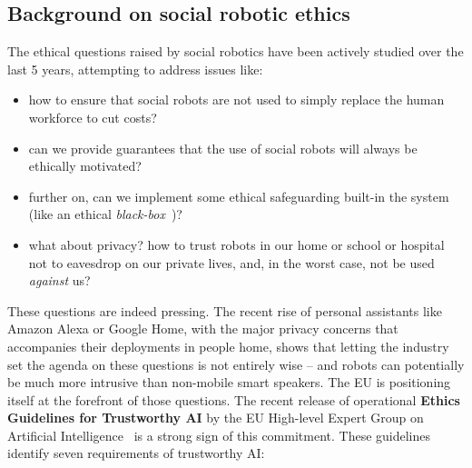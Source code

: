 \documentclass[11pt,a4paper]{report}
\begin{document}
\subsection{Background on social robotic ethics}

The ethical questions raised by social robotics have been actively studied over
the last 5 years, attempting to address issues like:

\begin{itemize}
    \item how to ensure that social robots are not used to simply replace the human
        workforce to cut costs?
    \item can we provide guarantees that the use of social robots will always be
        ethically motivated?
    \item further on, can we implement some ethical safeguarding built-in
        the system (like an ethical \emph{black-box}~\cite{winfield2017case})?
    \item what about privacy? how to trust robots in our home or school or
        hospital not to eavesdrop on our private lives, and, in the worst
        case, not be used \emph{against} us?
\end{itemize}

These questions are indeed pressing. The recent rise of personal assistants like
Amazon Alexa or Google Home, with the major privacy concerns that accompanies
their deployments in people home, shows that letting the industry set the agenda
on these questions is not entirely wise -- and robots can potentially be much
more intrusive than non-mobile smart speakers.  The EU is positioning itself at
the forefront of those questions. The recent release of operational \textbf{Ethics
Guidelines for Trustworthy AI} by the EU High-level Expert Group on Artificial
Intelligence~\cite{eu2019ethics} is a strong sign of this commitment. These
guidelines identify seven requirements of trustworthy AI:
\end{document}
